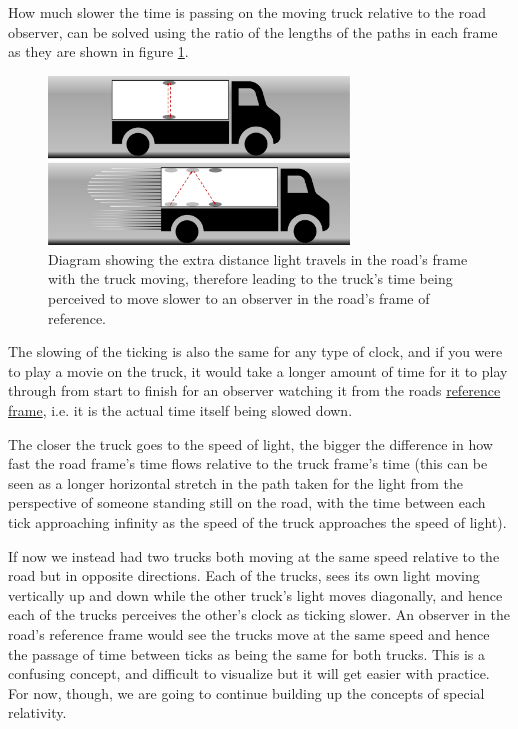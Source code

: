 How much slower the time is passing on the moving truck relative to the road observer, can be solved using the ratio of the lengths of the paths in each frame as they are shown in figure \ref{fig: truck clock}.

\begin{figure}[H]
	\centering
	\includegraphics[width=8cm]{images/pdf/lorry_clock.pdf}
	\caption{Diagram showing the extra distance light travels in the road's frame with the truck moving, therefore leading to the truck's time being perceived to move slower to an observer in the road's frame of reference.}
	\label{fig: truck clock}
\end{figure}

The slowing of the ticking is also the same for any type of clock, and if you were to play a movie on the truck, it would take a longer amount of time for it to play through from start to finish for an observer watching it from the roads \hyperlink{def-Reference-frame}{reference frame}, i.e. it is the actual time itself being slowed down.

The closer the truck goes to the speed of light, the bigger the difference in how fast the road frame's time flows relative to the truck frame's time (this can be seen as a longer horizontal stretch in the path taken for the light from the perspective of someone standing still on the road, with the time between each tick approaching infinity as the speed of the truck approaches the speed of light).

If now we instead had two trucks both moving at the same speed relative to the road but in opposite directions. Each of the trucks, sees its own light moving vertically up and down while the other truck's light moves diagonally, and hence each of the trucks perceives the other's clock as ticking slower. An observer in the road's reference frame would see the trucks move at the same speed and hence the passage of time between ticks as being the same for both trucks. This is a confusing concept, and difficult to visualize but it will get easier with practice. For now, though, we are going to continue building up the concepts of special relativity.

